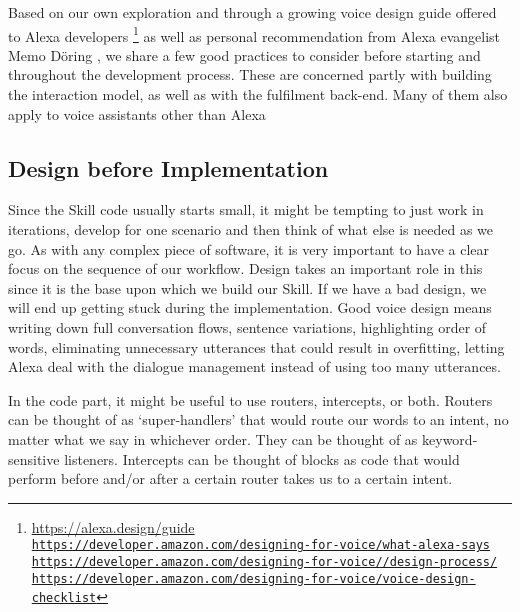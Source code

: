 Based on our own exploration and through a growing voice design guide offered to Alexa developers \footnote{\url{https://alexa.design/guide} \\ \href{https://developer.amazon.com/designing-for-voice/what-alexa-says/}{\lstinline|https://developer.amazon.com/designing-for-voice/what-alexa-says|}\\
	\href{https://developer.amazon.com/designing-for-voice/design-process/}{\lstinline|https://developer.amazon.com/designing-for-voice//design-process/|}\\
	\href{https://developer.amazon.com/designing-for-voice/voice-design-checklist}{\lstinline|https://developer.amazon.com/designing-for-voice/voice-design-checklist|}
} as well as personal recommendation from Alexa evangelist Memo Döring \cite{memo:devDay}, we share a few good practices to consider before starting and throughout the development process. These are concerned partly with building the interaction model, as well as with the fulfilment back-end. Many of them also apply to voice assistants other than Alexa






\subsection*{Design before Implementation}
Since the Skill code usually starts small, it might be tempting to just work in iterations, develop for one scenario and then think of what else is needed as we go.
As with any complex piece of software, it is very important to have a clear focus on the sequence of our workflow. Design takes an important role in this since it is the base upon which we build our Skill. If we have a bad design, we will end up getting stuck during the implementation. Good voice design means writing down full conversation flows, sentence variations, highlighting order of words, eliminating unnecessary utterances that could result in overfitting, letting Alexa deal with the dialogue management instead of using too many utterances.

In the code part, it might be useful to use routers, intercepts, or both.
Routers can be thought of as `super-handlers' that would route our words to an intent, no matter what we say in whichever order. They can be thought of as keyword-sensitive listeners. Intercepts can be thought of blocks as code that would perform before and/or after a certain router takes us to a certain intent.

